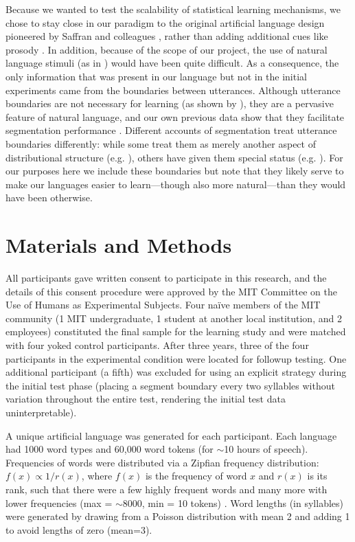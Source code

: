 \documentclass[10pt]{article}
\begin{document}
Because we wanted to test the scalability of statistical learning mechanisms, we chose to stay close in our paradigm to the original artificial language design pioneered by Saffran and colleagues \cite{saffran1996b}, rather than adding additional cues like prosody \cite{hay2011b}. In addition, because of the scope of our project, the use of natural language stimuli (as in \cite{pelucchi2009}) would have been quite difficult. As a consequence, the only information that was present in our language but not in the initial experiments came from the boundaries between utterances. Although utterance boundaries are not necessary for learning (as shown by \cite{saffran1996b}), they are a pervasive feature of natural language, and our own previous data show that they facilitate segmentation performance \cite{frank2010}. Different accounts of segmentation treat utterance boundaries differently: while some treat them as merely another aspect of distributional structure (e.g. \cite{goldwater2009}), others have given them special status (e.g. \cite{aslin1996}). For our purposes here we include these boundaries but note that they likely serve to make our languages easier to learn---though also more natural---than they would have been otherwise.

\section*{Materials and Methods}

All participants gave written consent to participate in this research, and the details of this consent procedure were approved by the MIT Committee on the Use of Humans as Experimental Subjects. Four na\"ive members of the MIT community (1 MIT undergraduate, 1 student at another local institution, and 2 employees) constituted the final sample for the learning study and were matched with four yoked control participants. After three years, three of the four participants in the experimental condition were located for followup testing. One additional participant (a fifth) was excluded for using an explicit strategy during the initial test phase (placing a segment boundary every two syllables without variation throughout the entire test, rendering the initial test data uninterpretable). 

A unique artificial language was generated for each participant. Each language had 1000 word types and 60,000 word tokens (for $\sim$10 hours of speech). Frequencies of words were distributed via a Zipfian frequency distribution: $f(x) \propto 1 / r(x)$, where $f(x)$ is the frequency of word $x$ and $r(x)$ is its rank, such that there were a few highly frequent words and many more with lower frequencies (max = $\sim$8000, min = 10 tokens) \cite{zipf1965}. Word lengths (in syllables) were generated by drawing from a Poisson distribution with mean 2 and adding 1 to avoid lengths of zero (mean=3).  
\end{document}
